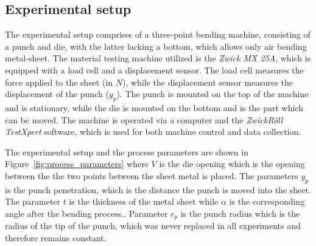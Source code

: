 %
%

\subsection{Experimental setup}\label{subsec:experimental-setup}
The experimental setup comprises of a three-point bending machine, consisting
of a punch and
die, with the latter lacking a bottom, which allows only air bending
metal-sheet.
The material testing machine utilized is the \textit{Zwick MX 25A}, which is
equipped with a load
cell and a displacement sensor.
The load cell measures the force applied to the sheet (in $N$), while the
displacement sensor
measures the displacement of the punch ($y_p$).
The punch is mounted on the top of the machine and is stationary, while the
die is mounted on the
bottom and is the part which can be moved.
The machine is operated via a computer and the \textit{ZwickRöll TestXpert}
software, which is
used for both machine control and data collection.

The experimental setup and the process parameters are shown in
Figure~\ref{fig:process_parameters} where $V$ is the die opening which is the
opening between the
the two points between the sheet metal is placed.
The parameters $y_p$ is the punch penetration, which is the distance the
punch is moved into the
sheet.
The parameter $t$ is the thickness of the metal sheet while $\alpha$ is the
corresponding
angle after the bending process..
Parameter $r_p$ is the punch radius which is the radius of the tip of the
punch, which was never
replaced in all experiments and therefore remains constant.


